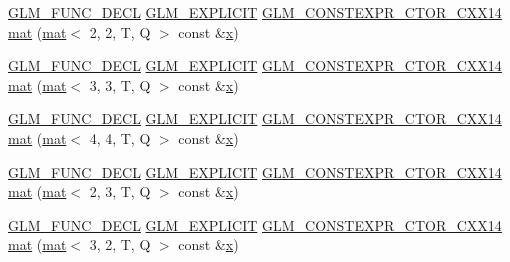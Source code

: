 \begin{DoxyCompactItemize}
\item 
\hyperlink{setup_8hpp_ab2d052de21a70539923e9bcbf6e83a51}{G\+L\+M\+\_\+\+F\+U\+N\+C\+\_\+\+D\+E\+CL} \hyperlink{setup_8hpp_a6c74f5a5e7b134ab69023ff9a30d4d5d}{G\+L\+M\+\_\+\+E\+X\+P\+L\+I\+C\+IT} \hyperlink{setup_8hpp_a0900f9145e68bf6061b6f5e7be3fa751}{G\+L\+M\+\_\+\+C\+O\+N\+S\+T\+E\+X\+P\+R\+\_\+\+C\+T\+O\+R\+\_\+\+C\+X\+X14} \hyperlink{structglm_1_1mat_3_014_00_013_00_01_t_00_01_q_01_4_ac0f83c0334e8f5a609727795ccc2826a}{mat} (\hyperlink{structglm_1_1mat}{mat}$<$ 2, 2, T, Q $>$ const \&\hyperlink{_s_d_l__opengl_8h_ad0e63d0edcdbd3d79554076bf309fd47}{x})
\item 
\hyperlink{setup_8hpp_ab2d052de21a70539923e9bcbf6e83a51}{G\+L\+M\+\_\+\+F\+U\+N\+C\+\_\+\+D\+E\+CL} \hyperlink{setup_8hpp_a6c74f5a5e7b134ab69023ff9a30d4d5d}{G\+L\+M\+\_\+\+E\+X\+P\+L\+I\+C\+IT} \hyperlink{setup_8hpp_a0900f9145e68bf6061b6f5e7be3fa751}{G\+L\+M\+\_\+\+C\+O\+N\+S\+T\+E\+X\+P\+R\+\_\+\+C\+T\+O\+R\+\_\+\+C\+X\+X14} \hyperlink{structglm_1_1mat_3_014_00_013_00_01_t_00_01_q_01_4_ad158325448a21878b8136cd77393dd3a}{mat} (\hyperlink{structglm_1_1mat}{mat}$<$ 3, 3, T, Q $>$ const \&\hyperlink{_s_d_l__opengl_8h_ad0e63d0edcdbd3d79554076bf309fd47}{x})
\item 
\hyperlink{setup_8hpp_ab2d052de21a70539923e9bcbf6e83a51}{G\+L\+M\+\_\+\+F\+U\+N\+C\+\_\+\+D\+E\+CL} \hyperlink{setup_8hpp_a6c74f5a5e7b134ab69023ff9a30d4d5d}{G\+L\+M\+\_\+\+E\+X\+P\+L\+I\+C\+IT} \hyperlink{setup_8hpp_a0900f9145e68bf6061b6f5e7be3fa751}{G\+L\+M\+\_\+\+C\+O\+N\+S\+T\+E\+X\+P\+R\+\_\+\+C\+T\+O\+R\+\_\+\+C\+X\+X14} \hyperlink{structglm_1_1mat_3_014_00_013_00_01_t_00_01_q_01_4_a7df5e4d37e912207fc06829d2012da9b}{mat} (\hyperlink{structglm_1_1mat}{mat}$<$ 4, 4, T, Q $>$ const \&\hyperlink{_s_d_l__opengl_8h_ad0e63d0edcdbd3d79554076bf309fd47}{x})
\item 
\hyperlink{setup_8hpp_ab2d052de21a70539923e9bcbf6e83a51}{G\+L\+M\+\_\+\+F\+U\+N\+C\+\_\+\+D\+E\+CL} \hyperlink{setup_8hpp_a6c74f5a5e7b134ab69023ff9a30d4d5d}{G\+L\+M\+\_\+\+E\+X\+P\+L\+I\+C\+IT} \hyperlink{setup_8hpp_a0900f9145e68bf6061b6f5e7be3fa751}{G\+L\+M\+\_\+\+C\+O\+N\+S\+T\+E\+X\+P\+R\+\_\+\+C\+T\+O\+R\+\_\+\+C\+X\+X14} \hyperlink{structglm_1_1mat_3_014_00_013_00_01_t_00_01_q_01_4_adcc76cf693f7f51391a4518133f65dd7}{mat} (\hyperlink{structglm_1_1mat}{mat}$<$ 2, 3, T, Q $>$ const \&\hyperlink{_s_d_l__opengl_8h_ad0e63d0edcdbd3d79554076bf309fd47}{x})
\item 
\hyperlink{setup_8hpp_ab2d052de21a70539923e9bcbf6e83a51}{G\+L\+M\+\_\+\+F\+U\+N\+C\+\_\+\+D\+E\+CL} \hyperlink{setup_8hpp_a6c74f5a5e7b134ab69023ff9a30d4d5d}{G\+L\+M\+\_\+\+E\+X\+P\+L\+I\+C\+IT} \hyperlink{setup_8hpp_a0900f9145e68bf6061b6f5e7be3fa751}{G\+L\+M\+\_\+\+C\+O\+N\+S\+T\+E\+X\+P\+R\+\_\+\+C\+T\+O\+R\+\_\+\+C\+X\+X14} \hyperlink{structglm_1_1mat_3_014_00_013_00_01_t_00_01_q_01_4_a064c3fe0b7f2b249c3966af1f25c12b6}{mat} (\hyperlink{structglm_1_1mat}{mat}$<$ 3, 2, T, Q $>$ const \&\hyperlink{_s_d_l__opengl_8h_ad0e63d0edcdbd3d79554076bf309fd47}{x})

\end{DoxyCompactItemize}
